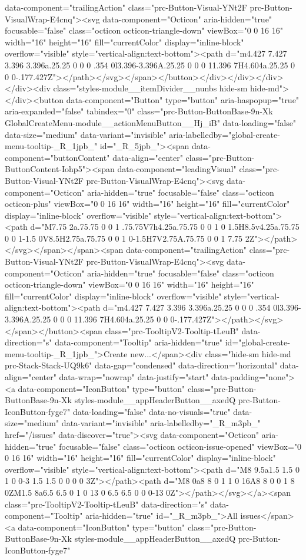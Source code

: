 data-component="trailingAction" class="prc-Button-Visual-YNt2F prc-Button-VisualWrap-E4cnq"><svg data-component="Octicon" aria-hidden="true" focusable="false" class="octicon octicon-triangle-down" viewBox="0 0 16 16" width="16" height="16" fill="currentColor" display="inline-block" overflow="visible" style="vertical-align:text-bottom"><path d="m4.427 7.427 3.396 3.396a.25.25 0 0 0 .354 0l3.396-3.396A.25.25 0 0 0 11.396 7H4.604a.25.25 0 0 0-.177.427Z"></path></svg></span></button></div></div></div></div><div class="styles-module__itemDivider__nunbs hide-sm hide-md"></div><button data-component="Button" type="button" aria-haspopup="true" aria-expanded="false" tabindex="0" class="prc-Button-ButtonBase-9n-Xk GlobalCreateMenu-module__actionMenuButton__Hj_iB" data-loading="false" data-size="medium" data-variant="invisible" aria-labelledby="global-create-menu-tooltip-_R_1jpb_" id="_R_5jpb_"><span data-component="buttonContent" data-align="center" class="prc-Button-ButtonContent-Iohp5"><span data-component="leadingVisual" class="prc-Button-Visual-YNt2F prc-Button-VisualWrap-E4cnq"><svg data-component="Octicon" aria-hidden="true" focusable="false" class="octicon octicon-plus" viewBox="0 0 16 16" width="16" height="16" fill="currentColor" display="inline-block" overflow="visible" style="vertical-align:text-bottom"><path d="M7.75 2a.75.75 0 0 1 .75.75V7h4.25a.75.75 0 0 1 0 1.5H8.5v4.25a.75.75 0 0 1-1.5 0V8.5H2.75a.75.75 0 0 1 0-1.5H7V2.75A.75.75 0 0 1 7.75 2Z"></path></svg></span></span><span data-component="trailingAction" class="prc-Button-Visual-YNt2F prc-Button-VisualWrap-E4cnq"><svg data-component="Octicon" aria-hidden="true" focusable="false" class="octicon octicon-triangle-down" viewBox="0 0 16 16" width="16" height="16" fill="currentColor" display="inline-block" overflow="visible" style="vertical-align:text-bottom"><path d="m4.427 7.427 3.396 3.396a.25.25 0 0 0 .354 0l3.396-3.396A.25.25 0 0 0 11.396 7H4.604a.25.25 0 0 0-.177.427Z"></path></svg></span></button><span class="prc-TooltipV2-Tooltip-tLeuB" data-direction="s" data-component="Tooltip" aria-hidden="true" id="global-create-menu-tooltip-_R_1jpb_">Create new...</span><div class="hide-sm hide-md prc-Stack-Stack-UQ9k6" data-gap="condensed" data-direction="horizontal" data-align="center" data-wrap="nowrap" data-justify="start" data-padding="none"><a data-component="IconButton" type="button" class="prc-Button-ButtonBase-9n-Xk styles-module__appHeaderButton__axedQ prc-Button-IconButton-fyge7" data-loading="false" data-no-visuals="true" data-size="medium" data-variant="invisible" aria-labelledby="_R_m3pb_" href="/issues" data-discover="true"><svg data-component="Octicon" aria-hidden="true" focusable="false" class="octicon octicon-issue-opened" viewBox="0 0 16 16" width="16" height="16" fill="currentColor" display="inline-block" overflow="visible" style="vertical-align:text-bottom"><path d="M8 9.5a1.5 1.5 0 1 0 0-3 1.5 1.5 0 0 0 0 3Z"></path><path d="M8 0a8 8 0 1 1 0 16A8 8 0 0 1 8 0ZM1.5 8a6.5 6.5 0 1 0 13 0 6.5 6.5 0 0 0-13 0Z"></path></svg></a><span class="prc-TooltipV2-Tooltip-tLeuB" data-direction="s" data-component="Tooltip" aria-hidden="true" id="_R_m3pb_">All issues</span><a data-component="IconButton" type="button" class="prc-Button-ButtonBase-9n-Xk styles-module__appHeaderButton__axedQ prc-Button-IconButton-fyge7" 